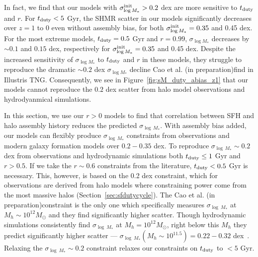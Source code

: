 \documentclass[12pt, letterpaper, preprint, tighten]{aastex62}
\newcommand{\edt}[1]{{\color{dred}{\bf} #1}}
\newcommand{\cao}{Cao et al. (in preparation)}
\newcommand{\tduty}{t_{\rm duty}}
\newcommand{\siglogm}{\sigma_{\log M_*}}
\begin{document}
\edt{
In fact, we find that our models with $\siglogm^{\rm init} > 0.2$ dex are more 
sensitive to $\tduty$ and $r$. For $\tduty < 5$ Gyr, the SHMR scatter in our models 
significantly decreases over $z=1$ to 0 even without assembly bias, for both 
$\siglogm^{\rm init} = 0.35$ and 0.45 dex. For the most extreme models, 
$\tduty=0.5$ Gyr and $r = 0.99$, $\siglogm$ decreases by $\sim0.1$ and $0.15$ dex, 
respectively for $\siglogm^{\rm init} = 0.35$ and 0.45 dex. Despite the increased
sensitivity of $\siglogm$ to $\tduty$ and $r$ in these models, they struggle to 
reproduce the dramatic $\sim 0.2$ dex $\siglogm$ decline \cao find in Illustris TNG. 
Consequently, we see in Figure~\ref{fig:sM_duty_abias_z1} that our models cannot
reproduce the $0.2$ dex scatter from halo model observations and hydrodyanmical
simulations. 
}


\edt{In this section, we use our $r > 0$ models to find that correlation between
SFH and halo assembly history reduces the predicted $\sigma_{\log\,M_*}$.
With assembly bias added, our models can flexibly produce $\sigma_{\log\,M_*}$
constraints from observations and modern galaxy formation models over
$0.2 - 0.35$ dex. To reproduce $\sigma_{\log\,M_*}\sim 0.2$ dex from observations
and hydrodynamic simulations both $t_{\rm duty} \leq 1$ Gyr and $r > 0.5$. If
we take the $r\sim0.6$ constraints from the literature, $t_{\rm duty} < 0.5$ Gyr
is necessary. This, however, is based on the 0.2 dex constraint, which
for observations are derived from halo models where constraining power
come from the most massive halos (Section~\ref{sec:sfdutycycle}). The
\cao constraint is the only one which specifically measures $\sigma_{\log~M_*}$
at $M_h \sim 10^{12}M_\odot$ and they find significantly higher scatter.
Though hydrodynamic simulations consistently find $\sigma_{\log~M_*}$ at
$M_h = 10^{12}M_\odot$, right below this $M_h$ they predict significantly
higher scatter --- $\sigma_{\log~M_*}(M_h\sim 10^{11.5}) = 0.22 - 0.32$
dex~\citep{wechsler2018}. Relaxing the $\sigma_{\log~M_*} \sim 0.2$ constraint
relaxes our constraints on $\tduty$ to $< 5$ Gyr.
}
\end{document}
